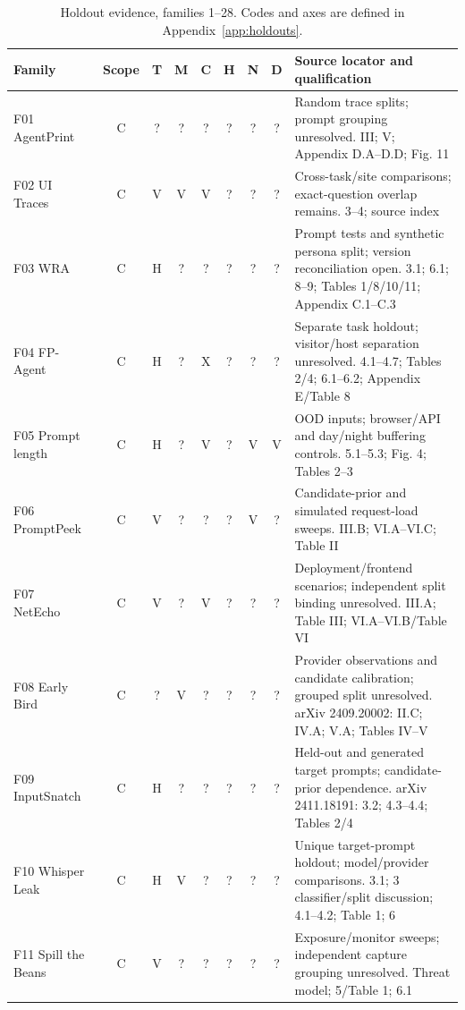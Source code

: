\begin{table}[p]\centering\footnotesize
\caption{Holdout evidence, families 1--28. Codes and axes are defined in Appendix~\ref{app:holdouts}.}\label{tab:holdouts1}
\setlength{\tabcolsep}{3pt}\begin{tabularx}{\textwidth}{@{}p{}cccccccY@{}}\toprule
Family & Scope & T & M & C & H & N & D & Source locator and qualification\\\midrule
F01 AgentPrint~\cite{agentprint2025} & C & ? & ? & ? & ? & ? & ? & Random trace splits; prompt grouping unresolved. III; V; Appendix D.A--D.D; Fig. 11\\
F02 UI Traces~\cite{uitraces2026} & C & V & V & V & ? & ? & ? & Cross-task/site comparisons; exact-question overlap remains. 3--4; source index\\
F03 WRA~\cite{jeong2026wra} & C & H & ? & ? & ? & ? & ? & Prompt tests and synthetic persona split; version reconciliation open. 3.1; 6.1; 8--9; Tables 1/8/10/11; Appendix C.1--C.3\\
F04 FP-Agent~\cite{wang2026fpagent} & C & H & ? & X & ? & ? & ? & Separate task holdout; visitor/host separation unresolved. 4.1--4.7; Tables 2/4; 6.1--6.2; Appendix E/Table 8\\
F05 Prompt length~\cite{weiss2024prompt} & C & H & ? & V & ? & V & V & OOD inputs; browser/API and day/night buffering controls. 5.1--5.3; Fig. 4; Tables 2--3\\
F06 PromptPeek~\cite{promptpeek2025} & C & V & ? & ? & ? & V & ? & Candidate-prior and simulated request-load sweeps. III.B; VI.A--VI.C; Table II\\
F07 NetEcho~\cite{netecho2025} & C & V & ? & V & ? & ? & ? & Deployment/frontend scenarios; independent split binding unresolved. III.A; Table III; VI.A--VI.B/Table VI\\
F08 Early Bird~\cite{earlybird2025} & C & ? & V & ? & ? & ? & ? & Provider observations and candidate calibration; grouped split unresolved. arXiv 2409.20002: II.C; IV.A; V.A; Tables IV--V\\
F09 InputSnatch~\cite{inputsnatch2024} & C & H & ? & ? & ? & ? & ? & Held-out and generated target prompts; candidate-prior dependence. arXiv 2411.18191: 3.2; 4.3--4.4; Tables 2/4\\
F10 Whisper Leak~\cite{whisperleak2025} & C & H & V & ? & ? & ? & ? & Unique target-prompt holdout; model/provider comparisons. 3.1; 3 classifier/split discussion; 4.1--4.2; Table 1; 6\\
F11 Spill the Beans~\cite{spillbeans2025} & C & V & ? & ? & ? & ? & ? & Exposure/monitor sweeps; independent capture grouping unresolved. Threat model; 5/Table 1; 6.1\\

\end{tabularx}
\end{table}
